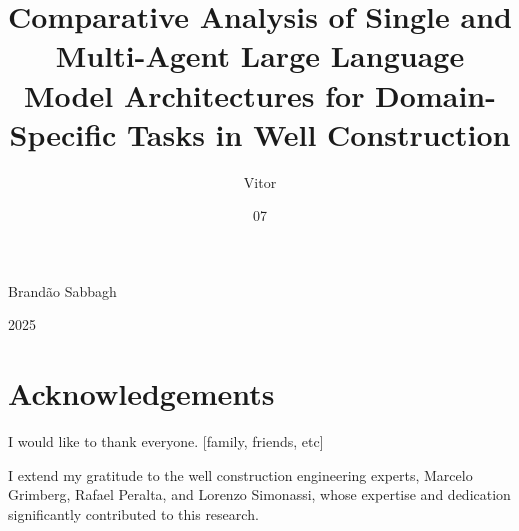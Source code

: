 \documentclass[msc,english]{coppe}
\begin{document}
\title{Comparative Analysis of Single and Multi-Agent Large Language Model Architectures for Domain-Specific Tasks in Well Construction}
\author{Vitor}{Brandão Sabbagh}

\date{07}{2025}


\maketitle

\frontmatter
\dedication{To Carolina, my life partner.}

\chapter*{Acknowledgements}

I would like to thank everyone. [family, friends, etc]

I extend my gratitude to the well construction engineering experts, Marcelo Grimberg, Rafael Peralta, and Lorenzo Simonassi, whose expertise and dedication significantly contributed to this research.
\end{document}
